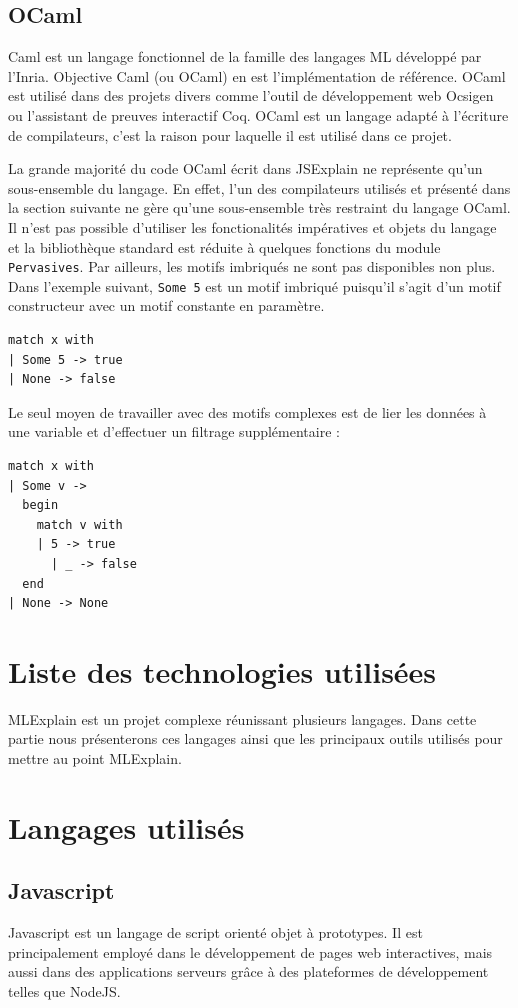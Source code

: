 \documentclass{easychair}
\begin{document}
\subsection{OCaml}
Caml est un langage fonctionnel de la famille des langages ML développé par 
l'Inria. Objective Caml (ou OCaml) en est l'implémentation de référence. OCaml 
est utilisé dans des projets divers comme l'outil de développement web Ocsigen 
ou l'assistant de preuves interactif Coq. OCaml est un langage adapté à 
l'écriture de compilateurs, c'est la raison pour laquelle il est utilisé dans ce 
projet.

La grande majorité du code OCaml écrit dans JSExplain ne représente qu'un 
sous-ensemble du langage. En effet, l'un des compilateurs utilisés et présenté 
dans la section suivante ne gère qu'une sous-ensemble très restraint du langage 
OCaml. Il n'est pas possible d'utiliser les fonctionalités impératives et 
objets du langage et la bibliothèque standard est réduite à quelques fonctions 
du module \verb|Pervasives|. Par ailleurs, les motifs imbriqués ne sont pas 
disponibles non plus. Dans l'exemple suivant, \verb|Some 5| est un motif 
imbriqué puisqu'il s'agit d'un motif constructeur avec un motif constante en 
paramètre.

\begin{verbatim}
match x with
| Some 5 -> true
| None -> false
\end{verbatim}

Le seul moyen de travailler avec des motifs complexes est de lier les données à 
une variable et d'effectuer un filtrage supplémentaire :

\begin{verbatim}
match x with
| Some v ->
  begin
    match v with
    | 5 -> true
      | _ -> false
  end
| None -> None
\end{verbatim}

\section{Liste des technologies utilisées}
MLExplain est un projet complexe réunissant plusieurs langages. Dans cette 
partie nous présenterons ces langages ainsi que les principaux outils utilisés 
pour mettre au point MLExplain.

\section{Langages utilisés}
\subsection{Javascript}
Javascript est un langage de script orienté objet à prototypes. Il est 
principalement employé dans le développement de pages web interactives, mais 
aussi dans des applications serveurs grâce à des plateformes de développement 
telles que NodeJS.
\end{document}
